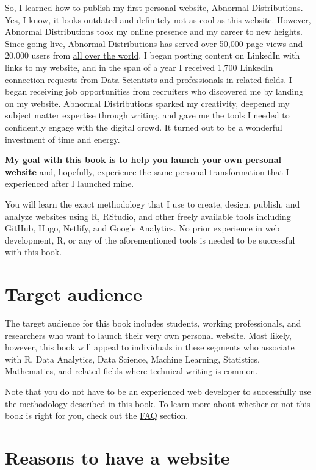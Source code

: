 \documentclass[
]{book}
\begin{document}
So, I learned how to publish my first personal website, \href{https://abndistro.com/}{Abnormal Distributions}. Yes, I know, it looks outdated and definitely not as cool as \href{https://benc.dev/}{this website}. However, Abnormal Distributions took my online presence and my career to new heights. Since going live, Abnormal Distributions has served over 50,000 page views and 20,000 users from \href{https://i.imgur.com/Qvx08ry.png}{all over the world}. I began posting content on LinkedIn with links to my website, and in the span of a year I received 1,700 LinkedIn connection requests from Data Scientists and professionals in related fields. I began receiving job opportunities from recruiters who discovered me by landing on my website. Abnormal Distributions sparked my creativity, deepened my subject matter expertise through writing, and gave me the tools I needed to confidently engage with the digital crowd. It turned out to be a wonderful investment of time and energy.

\textbf{My goal with this book is to help you launch your own personal website} and, hopefully, experience the same personal transformation that I experienced after I launched mine.

You will learn the exact methodology that I use to create, design, publish, and analyze websites using R, RStudio, and other freely available tools including GitHub, Hugo, Netlify, and Google Analytics. No prior experience in web development, R, or any of the aforementioned tools is needed to be successful with this book.

\hypertarget{target-audience}{%
\section{Target audience}\label{target-audience}}

The target audience for this book includes students, working professionals, and researchers who want to launch their very own personal website. Most likely, however, this book will appeal to individuals in these segments who associate with R, Data Analytics, Data Science, Machine Learning, Statistics, Mathematics, and related fields where technical writing is common.

Note that you do not have to be an experienced web developer to successfully use the methodology described in this book. To learn more about whether or not this book is right for you, check out the \protect\hyperlink{faq}{FAQ} section.

\hypertarget{reasons-to-have-a-website}{%
\section{Reasons to have a website}\label{reasons-to-have-a-website}}
\end{document}
